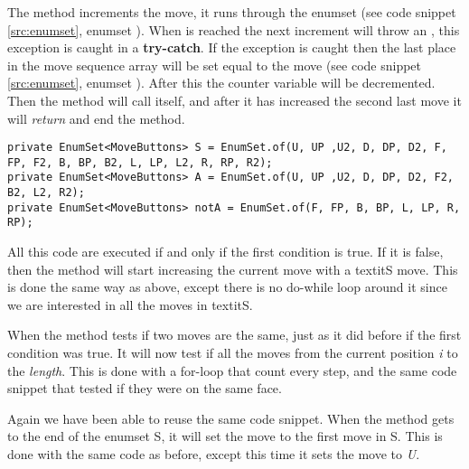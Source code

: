 The method increments the move, it runs through the enumset  (see code snippet \ref{src:enumset}, enumset ).
When  is reached the next increment will throw an , this exception is caught in a \textbf{try-catch}.
If the exception is caught then the last place in the move sequence array will be set equal to the move (see code snippet \ref{src:enumset}, enumset ).
After this the counter variable  will be decremented.
Then the method will call itself, and after it has increased the second last move it will \textit{return} and end the method.

\begin{lstlisting}[style=sourceCode, caption=\myCaption{The definition of the enumsets S, A, and notA.}, label=src:enumset]
private EnumSet<MoveButtons> S = EnumSet.of(U, UP ,U2, D, DP, D2, F, FP, F2, B, BP, B2, L, LP, L2, R, RP, R2);
private EnumSet<MoveButtons> A = EnumSet.of(U, UP ,U2, D, DP, D2, F2, B2, L2, R2);
private EnumSet<MoveButtons> notA = EnumSet.of(F, FP, B, BP, L, LP, R, RP);
\end{lstlisting}

All this code are executed if and only if the first condition is true.
If it is false, then the method will start increasing the current move with a textit{S} move.
This is done the same way as above, except there is no do-while loop around it since we are interested in all the moves in textit{S}.

When the method tests if two moves are the same, just as it did before if the first condition was true.
It will now test if all the moves from the current position \textit{i} to the \textit{length}.
This is done with a for-loop that count every step, and the same code snippet that tested if they were on the same face.

Again we have been able to reuse the same code snippet.
When the method gets to the end of the enumset S, it will set the move to the first move in S.
This is done with the same code as before, except this time it sets the move to \textit{U}.